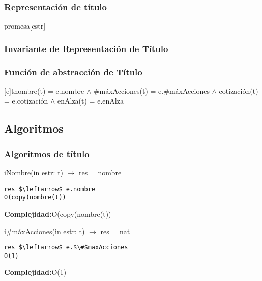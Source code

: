\subsubsection{Representaci\'on de t\'itulo}
\begin{Estructura}{promesa}[estr]
    \begin{Tupla}[estr]
    \end{Tupla}
\end{Estructura}


 \subsubsection{Invariante de Representaci\'on de T\'itulo}


\subsubsection{Funci\'on de abstracci\'on de T\'itulo}

[e]{t}{nombre(t) = e.nombre $\land$ $\#$m\'axAcciones(t) = e.$\#$m\'axAcciones $\land$ cotizaci\'on(t) = e.cotizaci\'on $\land$ enAlza(t) = e.enAlza}

  \subsection{Algoritmos}
\subsubsection{Algoritmos de t\'itulo}

iNombre(in estr: t) $\rightarrow$ res = nombre
\begin{lstlisting}[mathescape]
 res $\leftarrow$ e.nombre                                                        O(copy(nombre(t))
\end{lstlisting}
\textbf{Complejidad:}O(copy(nombre(t))

i$\#$m\'axAcciones(in estr: t) $\rightarrow$ res = nat
\begin{lstlisting}[mathescape]
 res $\leftarrow$ e.$\#$maxAcciones                                                   O(1)
\end{lstlisting}
\textbf{Complejidad:}O(1)


